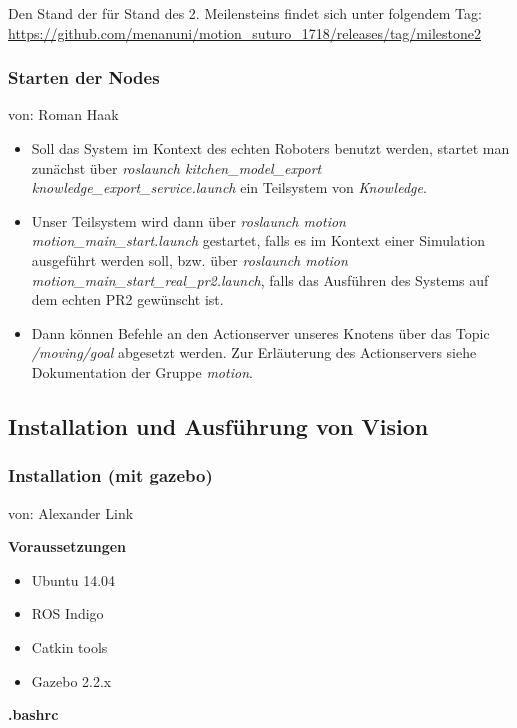 \documentclass{suturo}
\makeatletter
\newcommand{\chapterauthor}[1]{%
  {\parindent0pt\vspace*{-27pt}%
  \linespread{0}\small\begin{flushright}von: #1\end{flushright}%
  \par\nobreak\vspace*{0pt}}
  \@afterheading%
}
\makeatother
\begin{document}
Den Stand der für Stand  des 2. Meilensteins findet sich unter folgendem Tag: \\
\url{https://github.com/menanuni/motion_suturo_1718/releases/tag/milestone2} \\

\subsubsection{Starten der Nodes}
\chapterauthor{Roman Haak}
\begin{itemize}

\item Soll das System im Kontext des echten Roboters benutzt werden, startet man zunächst über \textit{roslaunch kitchen\_model\_export knowledge\_export\_service.launch} ein Teilsystem von \textit{Knowledge}.

\item Unser Teilsystem wird dann über \textit{roslaunch motion motion\_main\_start.launch} gestartet, falls es im Kontext einer Simulation ausgeführt werden soll, bzw. über \textit{roslaunch motion motion\_main\_start\_real\_pr2.launch}, falls das Ausführen des Systems auf dem echten PR2 gewünscht ist.

\item Dann können Befehle an den Actionserver unseres Knotens über das Topic \textit{/moving/goal} abgesetzt werden. Zur Erläuterung des Actionservers siehe Dokumentation der Gruppe \textit{motion}.
\end{itemize}

\subsection{Installation und Ausführung von Vision}

\subsubsection{Installation (mit gazebo)}
\chapterauthor{Alexander Link}

\textbf{Voraussetzungen}

\begin{itemize}
\item Ubuntu 14.04
\item ROS Indigo
\item Catkin tools
\item Gazebo 2.2.x
\end{itemize}

\textbf{.bashrc}
\end{document}
